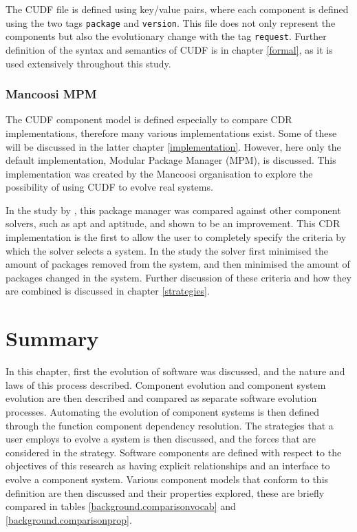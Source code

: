 The CUDF file is defined using key/value pairs, where each component is defined using the two tags \verb+package+ and \verb+version+.
This file does not only represent the components but also the evolutionary change with the tag \verb+request+.
Further definition of the syntax and semantics of CUDF is in chapter \ref{formal}, as it is used extensively throughout this study.

\subsubsection{Mancoosi MPM}
The CUDF component model is defined especially to compare CDR implementations, therefore many various implementations exist.
Some of these will be discussed in the latter chapter \ref{implementation}.
However, here only the default implementation, Modular Package Manager \citep{abate2011} (MPM), is discussed.
This implementation was created by the Mancoosi organisation to explore the possibility of using CUDF to evolve real systems.

In the study by \cite{abate2011}, this package manager was compared against other component solvers, such as apt and aptitude, and shown to be an improvement.
This CDR implementation is the first to allow the user to completely specify the criteria by which the solver selects a system.
In the study the solver first minimised the amount of packages removed from the system, and then minimised the amount of packages changed in the system.
Further discussion of these criteria and how they are combined is discussed in chapter \ref{strategies}. 

\section{Summary}
In this chapter, first the evolution of software was discussed, and the nature and laws of this process described.
Component evolution and component system evolution are then described and compared as separate software evolution processes.
Automating the evolution of component systems is then defined through the function component dependency resolution.
The strategies that a user employs to evolve a system is then discussed, and the forces that are considered in the strategy.
Software components are defined with respect to the objectives of this research as having explicit relationships and an interface to evolve a component system.
Various component models that conform to this definition are then discussed and their properties explored, these are briefly compared in tables \ref{background.comparisonvocab} and \ref{background.comparisonprop}.

